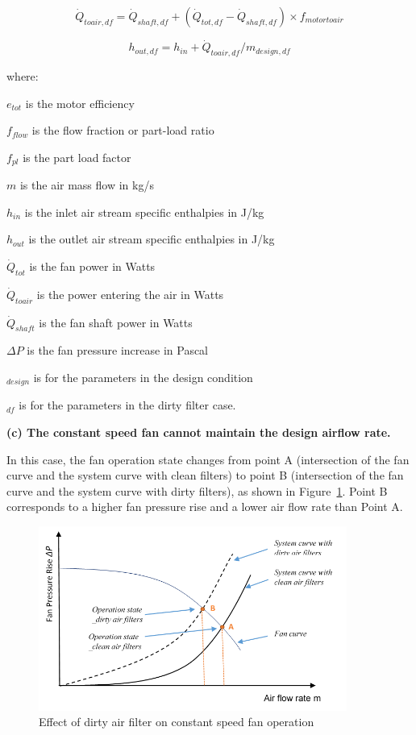 \begin{equation}
\dot{Q}_{toair,df} = \dot{Q}_{shaft,df} +( \dot{Q}_{tot,df} - \dot{Q}_{shaft,df}) \times f_{motortoair}
\end{equation}

\begin{equation}
h_{out,df} = h_{in} + \dot{Q}_{toair,df} / m_{design,df}
\end{equation}

where:

\(e_{tot}\) is the motor efficiency

\(f_{flow}\) is the flow fraction or part-load ratio

\(f_{pl}\) is the part load factor

\(m\) is the air mass flow in kg/s

\(h_{in}\) is the inlet air stream specific enthalpies in J/kg

\(h_{out}\) is the outlet air stream specific enthalpies in J/kg

\(\dot{Q}_{tot}\) is the fan power in Watts

\(\dot{Q}_{toair}\) is the power entering the air in Watts

\(\dot{Q}_{shaft}\) is the fan shaft power in Watts

\(\Delta P\) is the fan pressure increase in Pascal

\(_{design}\) is for the parameters in the design condition

\(_{df}\) is for the parameters in the dirty filter case.

\textbf{(c) The constant speed fan cannot maintain the design airflow rate.}

In this case, the fan operation state changes from point A (intersection of the fan curve and the system curve with clean filters) to point B (intersection of the fan curve and the system curve with dirty filters), as shown in Figure~\ref{fig:effect-of-dirty-air-filter-on-constant-speed}. Point B corresponds to a higher fan pressure rise and a lower air flow rate than Point A.

\begin{figure}[hbtp] %
\centering
\includegraphics[width=0.9\textwidth, height=0.9\textheight, keepaspectratio=true]{media/image8008.png}
\caption{Effect of dirty air filter on constant speed fan operation \protect \label{fig:effect-of-dirty-air-filter-on-constant-speed}}
\end{figure}

